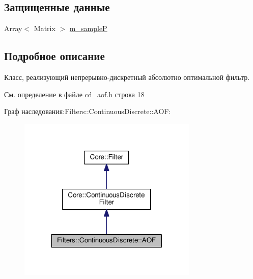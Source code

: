 \subsection*{Защищенные данные}
\begin{DoxyCompactItemize}
\item 
Array$<$ Matrix $>$ \hyperlink{class_filters_1_1_continuous_discrete_1_1_a_o_f_a31111852e94dab62675d8692a4c22df1}{m\+\_\+sampleP}
\end{DoxyCompactItemize}


\subsection{Подробное описание}
Класс, реализующий непрерывно-\/дискретный абсолютно оптимальной фильтр. 

См. определение в файле cd\+\_\+aof.\+h строка 18



Граф наследования\+:Filters\+:\+:Continuous\+Discrete\+:\+:A\+OF\+:
\nopagebreak
\begin{figure}[H]
\begin{center}
\leavevmode
\includegraphics[width=242pt]{class_filters_1_1_continuous_discrete_1_1_a_o_f__inherit__graph}
\end{center}
\end{figure}


